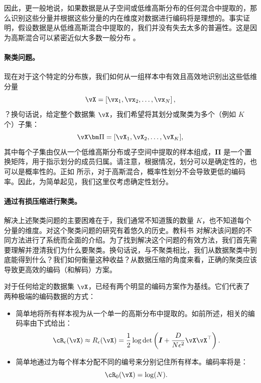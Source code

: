 \documentclass[../../book-main_zh.tex]{subfiles}
\begin{document}
因此，更一般地说，如果数据是从子空间或低维高斯分布的任何混合中提取的，那么识别这些分量并根据这些分量的内在维度对数据进行编码将是理想的。事实证明，假设数据是从低维高斯混合中提取的，我们并没有失去太多的普遍性。这是因为高斯混合可以紧密近似大多数一般分布 \cite{borkar2016gaussian}。

\paragraph{聚类问题。}
现在对于这个特定的分布族，我们如何从一组样本中有效且高效地识别出这些低维分量
\begin{equation}
    \vX = \left[\vx_1, \vx_2, \ldots, \vx_N\right],
\end{equation}
？换句话说，给定整个数据集 $\vX$，我们希望将其划分或聚类为多个（例如 $K$ 个）子集：
\begin{equation}
    \vX\bm \Pi = [\vX_1, \vX_2, \dots, \vX_K],
\end{equation}
其中每个子集由仅从一个低维高斯分布或子空间中提取的样本组成，$\bm \Pi$ 是一个置换矩阵，用于指示划分的成员归属。请注意，根据情况，划分可以是确定性的，也可以是概率性的。正如 \cite{ma2007segmentation} 所示，对于高斯混合，概率性划分不会导致更低的编码率。因此，为简单起见，我们这里仅考虑确定性划分。

\paragraph{通过有损压缩进行聚类。}
解决上述聚类问题的主要困难在于，我们通常不知道簇的数量 $K$，也不知道每个分量的维度。对这个聚类问题的研究有着悠久的历史。教科书 \cite{GPCA} 对解决该问题的不同方法进行了系统而全面的介绍。为了找到解决这个问题的有效方法，我们首先需要理解并澄清我们为什么要聚类。换句话说，与不聚类相比，我们从数据聚类中到底能得到什么？我们如何衡量这种收益？从数据压缩的角度来看，正确的聚类应该导致更高效的编码（和解码）方案。

对于任何给定的数据集 $\vX$，已经有两个明显的编码方案作为基线。它们代表了两种极端的编码数据的方式：
\begin{itemize}
    \item 简单地将所有样本视为从一个单一的高斯分布中提取的。如前所述，相关的编码率由下式给出：
        \begin{equation}
            \cR_{\epsilon}(\vX) \approx R_{\epsilon}(\vX) =
            \frac{1}{2} \log \det \left(\boldsymbol{I} +
            \frac{D}{N\epsilon^2} \vX\vX^\top \right).
        \end{equation}
    \item 简单地通过为每个样本分配不同的编号来分别记住所有样本。编码率将是：
        \begin{equation}
            \cR_0(\vX) = \log(N).
        \end{equation}
\end{itemize}
\end{document}
